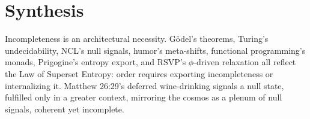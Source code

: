 \documentclass{article}
\begin{document}
\section{Synthesis}
\label{sec:synthesis}
Incompleteness is an architectural necessity. G\"{o}del's theorems, Turing's undecidability, NCL's null signals, humor's meta-shifts, functional programming's monads, Prigogine's entropy export, and RSVP's \(\phi\)-driven relaxation all reflect the Law of Superset Entropy: order requires exporting incompleteness or internalizing it. Matthew 26:29's deferred wine-drinking signals a null state, fulfilled only in a greater context, mirroring the cosmos as a plenum of null signals, coherent yet incomplete.

\newpage


\newpage


\end{document}
